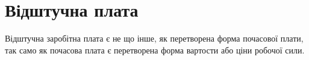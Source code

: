 \section{Відштучна плата}
\vspace{-2\bigskipamount}

Відштучна заробітна плата є не що інше, як перетворена
форма почасової плати, так само як почасова плата є перетворена
форма вартости або ціни робочої сили.
